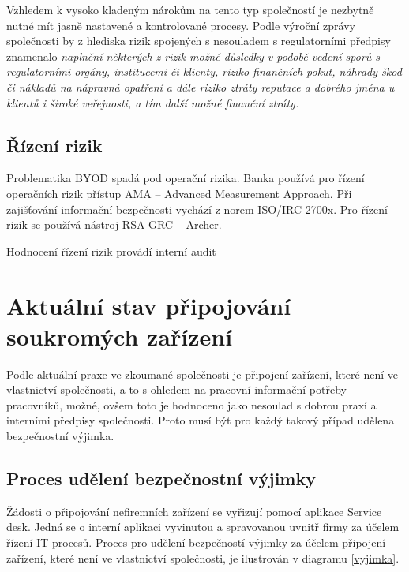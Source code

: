 Vzhledem k vysoko kladeným nárokům na tento typ společností je nezbytně nutné mít jasně nastavené a kontrolované procesy. Podle výroční zprávy společnosti by z hlediska rizik spojených s nesouladem s regulatorními předpisy znamenalo \textit{naplnění některých z rizik  možné důsledky v podobě vedení sporů s regulatorními orgány, institucemi či klienty, riziko finančních pokut, náhrady škod či nákladů na nápravná opatření a dále riziko ztráty reputace a dobrého jména u klientů i široké veřejnosti, a tím další možné finanční ztráty.}

\subsection{Řízení rizik}
Problematika BYOD spadá pod operační rizika. Banka používá pro řízení operačních rizik přístup AMA -- Advanced Measurement Approach. Při zajišťování informační bezpečnosti vychází z norem ISO/IRC 2700x. Pro řízení rizik se používá nástroj RSA GRC -- Archer.

Hodnocení řízení rizik provádí interní audit


\section{Aktuální stav připojování soukromých zařízení}
Podle aktuální praxe ve zkoumané společnosti je připojení zařízení, které není ve vlastnictví společnosti, a to s ohledem na pracovní informační potřeby pracovníků, možné, ovšem toto je hodnoceno jako nesoulad s dobrou praxí a interními předpisy společnosti. Proto musí být pro každý takový případ udělena bezpečnostní výjimka.

\subsection{Proces udělení bezpečnostní výjimky}
Žádosti o připojování nefiremních zařízení se vyřizují pomocí aplikace Service desk. Jedná se o interní aplikaci vyvinutou a spravovanou uvnitř firmy za účelem řízení IT procesů. Proces pro udělení bezpečností výjimky za účelem připojení zařízení, které není ve vlastnictví společnosti, je ilustrován v diagramu \ref{vyjimka}.

